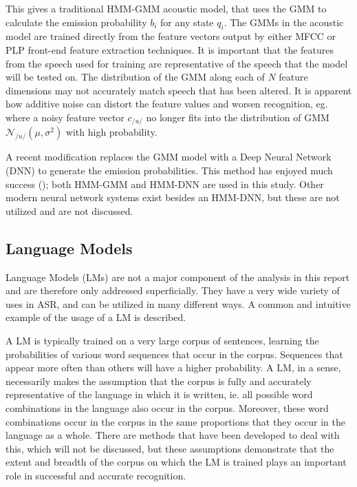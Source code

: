 This gives a traditional HMM-GMM acoustic model, that uses the GMM to calculate the emission probability $b_i$ for any state $q_i$.  The GMMs in the acoustic model are trained directly from the feature vectors output by either MFCC or PLP front-end feature extraction techniques.  It is important that the features from the speech used for training are representative of the speech that the model will be tested on.  The distribution of the GMM along each of $N$ feature dimensions may not accurately match speech that has been altered.  It is apparent how additive noise can distort the feature values and worsen recognition, eg. where a noisy feature vector $c_{/u/}$ no longer fits into the distribution of GMM $\mathcal{N}_{/u/}(\mu,\sigma^2)$ with high probability.

A recent modification replaces the GMM model with a Deep Neural Network (DNN) to generate the emission probabilities. This method has enjoyed much success (\cite{zhang:17}); both HMM-GMM and HMM-DNN are used in this study.  Other modern neural network systems exist besides an HMM-DNN, but these are not utilized and are not discussed.





\subsection{Language Models}\label{sec:lang-mod}

Language Models (LMs) are not a major component of the analysis in this report and are therefore only addressed superficially.  They have a very wide variety of uses in ASR, and can be utilized in many different ways.  A common and intuitive example of the usage of a LM is described.

A LM is typically trained on a very large corpus of sentences, learning the probabilities of various word sequences that occur in the corpus.  Sequences that appear more often than others will have a higher probability.  A LM, in a sense, necessarily makes the assumption that the corpus is fully and accurately representative of the language in which it is written, ie. all possible word combinations in the language also occur in the corpus. Moreover, these word combinations occur in the corpus in the same proportions that they occur in the language as a whole.  There are methods that have been developed to deal with this, which will not be discussed, but these assumptions demonstrate that the extent and breadth of the corpus on which the LM is trained plays an important role in successful and accurate recognition.  

